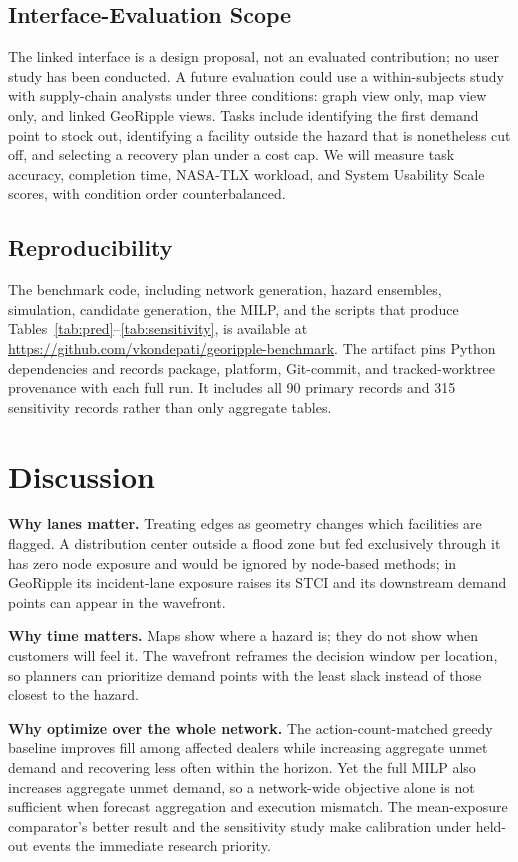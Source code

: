 \documentclass[conference]{IEEEtran}
\begin{document}
\subsection{Interface-Evaluation Scope}
The linked interface is a design proposal, not an evaluated contribution; no
user study has been conducted. A future evaluation could use a
within-subjects study with
supply-chain analysts under three conditions: graph view only, map view
only, and linked GeoRipple views. Tasks include identifying the first
demand point to stock out, identifying a facility outside the hazard
that is nonetheless cut off, and selecting a recovery plan under a cost
cap. We will measure task accuracy, completion time, NASA-TLX workload,
and System Usability Scale scores, with condition order counterbalanced.

\subsection{Reproducibility}
The benchmark code, including network generation, hazard ensembles,
simulation, candidate generation, the MILP, and the scripts that produce
Tables~\ref{tab:pred}--\ref{tab:sensitivity}, is available at
\url{https://github.com/vkondepati/georipple-benchmark}. The artifact pins
Python dependencies and records package, platform, Git-commit, and
tracked-worktree provenance with each full run. It includes all 90 primary
records and 315 sensitivity records rather than only aggregate tables.

\section{Discussion}
\textbf{Why lanes matter.} Treating edges as geometry changes which
facilities are flagged. A distribution center outside a flood zone but
fed exclusively through it has zero node exposure and would be ignored by
node-based methods; in GeoRipple its incident-lane exposure raises its
STCI and its downstream demand points can appear in the wavefront.

\textbf{Why time matters.} Maps show where a hazard is; they do not show
when customers will feel it. The wavefront reframes the decision window
per location, so planners can prioritize demand points with the least
slack instead of those closest to the hazard.

\textbf{Why optimize over the whole network.} The action-count-matched greedy
baseline improves fill among affected dealers while increasing aggregate
unmet demand and recovering less often within the horizon. Yet the full MILP
also increases aggregate unmet demand, so a network-wide objective alone is
not sufficient when forecast aggregation and execution mismatch. The
mean-exposure comparator's better result and the sensitivity study make
calibration under held-out events the immediate research priority.
\end{document}
